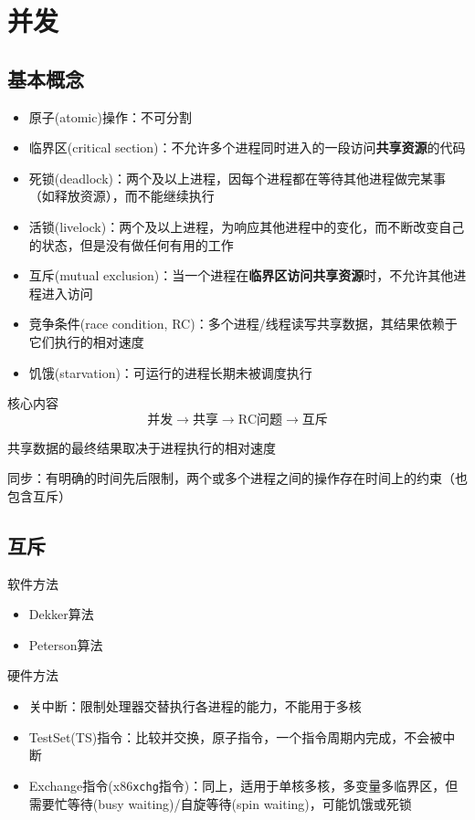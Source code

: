 
\section{并发}
\subsection{基本概念}
\begin{itemize}
    \item 原子(atomic)操作：不可分割
    \item 临界区(critical section)：不允许多个进程同时进入的一段访问\textbf{共享资源}的代码
    \item 死锁(deadlock)：两个及以上进程，因每个进程都在等待其他进程做完某事（如释放资源），而不能继续执行
    \item 活锁(livelock)：两个及以上进程，为响应其他进程中的变化，而不断改变自己的状态，但是没有做任何有用的工作
    \item 互斥(mutual exclusion)：当一个进程在\textbf{临界区访问共享资源}时，不允许其他进程进入访问
    \item 竞争条件(race condition, RC)：多个进程/线程读写共享数据，其结果依赖于它们执行的相对速度
    \item 饥饿(starvation)：可运行的进程长期未被调度执行
\end{itemize}

核心内容
\[\text{并发}\to\text{共享}\to\text{RC问题}\to\text{互斥}\]

共享数据的最终结果取决于进程执行的相对速度

同步：有明确的时间先后限制，两个或多个进程之间的操作存在时间上的约束（也包含互斥）

\subsection{互斥}
软件方法
\begin{itemize}
    \item Dekker算法
    \item Peterson算法
\end{itemize}
硬件方法
\begin{itemize}
    \item 关中断：限制处理器交替执行各进程的能力，不能用于多核
    \item TestSet(TS)指令：比较并交换，原子指令，一个指令周期内完成，不会被中断
    \item Exchange指令(x86\verb'xchg'指令)：同上，适用于单核多核，多变量多临界区，但需要忙等待(busy waiting)/自旋等待(spin waiting)，可能饥饿或死锁
\end{itemize}

